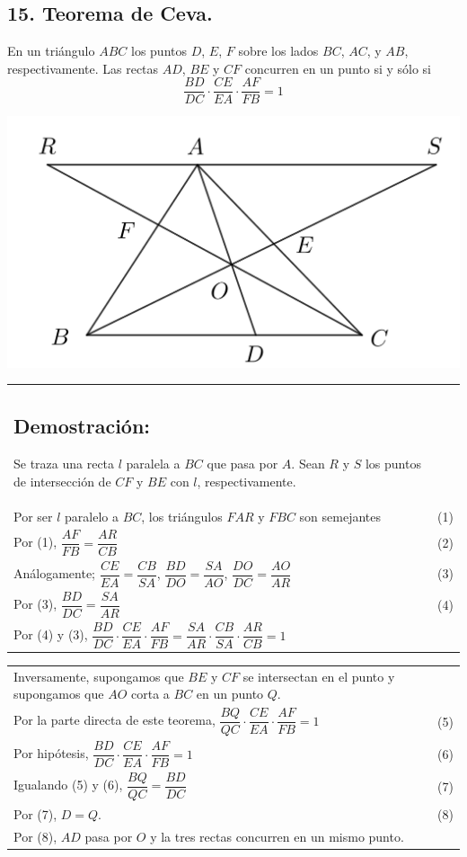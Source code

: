 \documentclass[12pt,a4paper]{article}
\begin{document}
\subsection*{15. Teorema de Ceva.}
En un triángulo $ABC$ los puntos $D$, $E$, $F$ sobre los lados $BC$, $AC$, y $AB$, respectivamente. Las rectas $AD$, $BE$ y $CF$ concurren en un punto si y sólo si
$$\dfrac{BD}{DC}\cdot\dfrac{CE}{EA}\cdot\dfrac{AF}{FB}=1$$
\begin{center}
\includegraphics[scale=0.8]{Ceva.png} 
\end{center}
\begin{tabular}{p{15.9 cm} p{1cm}}
\subsection*{Demostración:}
Se traza una recta $l$ paralela a $BC$ que pasa por $A$. Sean $R$ y $S$ los puntos de intersección de $CF$ y $BE$ con $l$, respectivamente.
\\Por ser $l$ paralelo a $BC$, los triángulos $FAR$ y $FBC$ son semejantes& (1)
\\Por (1), $\dfrac{AF}{FB}=\dfrac{AR}{CB}$&(2) 
\\Análogamente; $\dfrac{CE}{EA}=\dfrac{CB}{SA}$, $\dfrac{BD}{DO}=\dfrac{SA}{AO}$, $\dfrac{DO}{DC}=\dfrac{AO}{AR}$&(3)
\\Por (3), $\dfrac{BD}{DC}=\dfrac{SA}{AR}$&(4)
\\Por (4) y (3), $\dfrac{BD}{DC}\cdot \dfrac{CE}{EA}\cdot \dfrac{AF}{FB}=\dfrac{SA}{AR}\cdot \dfrac{CB}{SA}\cdot \dfrac{AR}{CB}=1$
\end{tabular}
\begin{tabular}{p{15.9 cm} p{1cm}}
\\Inversamente, supongamos que $BE$ y $CF$ se intersectan en el punto y supongamos que $AO$ corta a $BC$ en un punto $Q$. 
\\Por la parte directa de este teorema, $\dfrac{BQ}{QC}\cdot\dfrac{CE}{EA}\cdot\dfrac{AF}{FB}=1$ &(5)
\\Por hipótesis, $\dfrac{BD}{DC}\cdot\dfrac{CE}{EA}\cdot\dfrac{AF}{FB}=1$&(6)
\\Igualando (5) y (6), $\dfrac{BQ}{QC}=\dfrac{BD}{DC}$ &(7)
\\Por (7), $D=Q.$ &(8) 
\\Por (8), $AD$ pasa por $O$ y la tres rectas concurren en un mismo punto.
\end{tabular}
\end{document}
